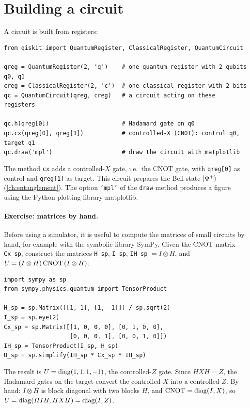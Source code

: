 \section{Building a circuit}
A circuit is built from registers:
\begin{lstlisting}
from qiskit import QuantumRegister, ClassicalRegister, QuantumCircuit

qreg = QuantumRegister(2, 'q')    # one quantum register with 2 qubits q0, q1
creg = ClassicalRegister(2, 'c')  # one classical register with 2 bits
qc = QuantumCircuit(qreg, creg)   # a circuit acting on these registers

qc.h(qreg[0])                     # Hadamard gate on q0
qc.cx(qreg[0], qreg[1])           # controlled-X (CNOT): control q0, target q1
qc.draw('mpl')                    # draw the circuit with matplotlib
\end{lstlisting}
The method \texttt{cx} adds a controlled-$X$ gate, i.e.\ the CNOT gate, with \texttt{qreg[0]} as control and \texttt{qreg[1]} as target. This circuit prepares the Bell state
$\left|\Phi^+\right\rangle$ (\cref{ch:entanglement}). The option \texttt{'mpl'} of the \texttt{draw} method produces a figure using the Python plotting library matplotlib.

\paragraph{Exercise: matrices by hand.} Before using a simulator, it is useful to compute the matrices of small circuits by hand, for example with the symbolic library SymPy. Given the CNOT
matrix \texttt{Cx\_sp}, construct the matrices \texttt{H\_sp}, \texttt{I\_sp}, \texttt{IH\_sp} $=I\otimes H$, and $U=(I\otimes H)\,\mathrm{CNOT}\,(I\otimes H)$:
\begin{lstlisting}
import sympy as sp
from sympy.physics.quantum import TensorProduct

H_sp = sp.Matrix([[1, 1], [1, -1]]) / sp.sqrt(2)
I_sp = sp.eye(2)
Cx_sp = sp.Matrix([[1, 0, 0, 0], [0, 1, 0, 0],
                   [0, 0, 0, 1], [0, 0, 1, 0]])
IH_sp = TensorProduct(I_sp, H_sp)
U_sp = sp.simplify(IH_sp * Cx_sp * IH_sp)
\end{lstlisting}
The result is $U=\operatorname{diag}(1,1,1,-1)$, the controlled-$Z$ gate. Since $HXH=Z$, the Hadamard gates on the target convert the controlled-$X$ into a controlled-$Z$. By hand: $I\otimes H$ is
block diagonal with two blocks $H$, and $\mathrm{CNOT}=\operatorname{diag}(I,X)$, so $U=\operatorname{diag}(HIH,HXH)=\operatorname{diag}(I,Z)$.

